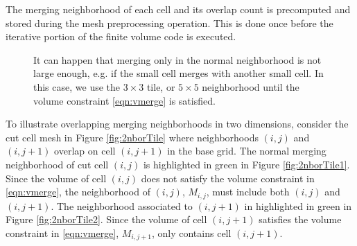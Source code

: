 The merging neighborhood of each cell and its overlap count is precomputed and stored during the mesh preprocessing operation.  This is done once before the iterative portion of the finite volume code is executed.
\begin{figure}[h]
\hspace*{.5in}
	\hfill
	\caption{\sf It can happen that merging only in the normal neighborhood is not 
        large enough, e.g. if the small cell merges with another small cell.  
        In this case, we use the $3\times 3$ tile, or $5\times5$ neighborhood 
        until the volume constraint \eqref{eqn:vmerge} is satisfied.}
\end{figure}


To illustrate overlapping merging neighborhoods in two dimensions, consider the cut cell mesh in Figure \ref{fig:2nborTile} where neighborhoods $(i,j)$ and $(i,j+1)$ overlap on cell $(i,j+1)$ in the base grid.  The normal merging neighborhood of cut cell $(i,j)$ is highlighted in green in Figure \ref{fig:2nborTile1}.  
Since the volume of cell $(i,j)$ does not satisfy the volume constraint in \eqref{eqn:vmerge}, the neighborhood of $(i,j)$, $M_{i,j}$, must include both $(i,j)$ and $(i,j+1)$.  
The neighborhood associated to $(i,j+1)$ in highlighted in green in Figure \ref{fig:2nborTile2}.  Since the volume of cell $(i,j+1)$ satisfies the volume constraint in \eqref{eqn:vmerge}, $M_{i,j+1}$, only contains cell $(i,j+1)$.
  



